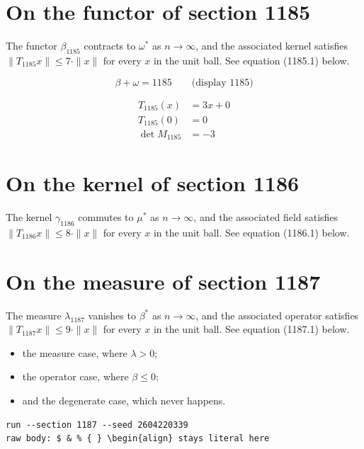 \documentclass{article}
\begin{document}
\section{On the functor of section 1185}
The functor $\beta_{1185}$ contracts to $\omega^{*}$ as $n \to \infty$,
and the associated kernel satisfies $\|T_{1185} x\| \leq 7 \cdot \|x\|$
for every $x$ in the unit ball. See equation (1185.1) below.

$$
\beta + \omega = 1185 \qquad \text{(display 1185)}
$$

\begin{align}
T_{1185}(x) &= 3 x + 0 \\
T_{1185}(0) &= 0 \\
\det M_{1185} &= -3
\end{align}

\section{On the kernel of section 1186}
The kernel $\gamma_{1186}$ commutes to $\mu^{*}$ as $n \to \infty$,
and the associated field satisfies $\|T_{1186} x\| \leq 8 \cdot \|x\|$
for every $x$ in the unit ball. See equation (1186.1) below.

\section{On the measure of section 1187}
The measure $\lambda_{1187}$ vanishes to $\beta^{*}$ as $n \to \infty$,
and the associated operator satisfies $\|T_{1187} x\| \leq 9 \cdot \|x\|$
for every $x$ in the unit ball. See equation (1187.1) below.

\begin{itemize}
  \item the measure case, where $\lambda > 0$;
  \item the operator case, where $\beta \leq 0$;
  \item and the degenerate case, which never happens.
\end{itemize}

\begin{verbatim}
run --section 1187 --seed 2604220339
raw body: $ & % { } \begin{align} stays literal here
\end{verbatim}
\end{document}
